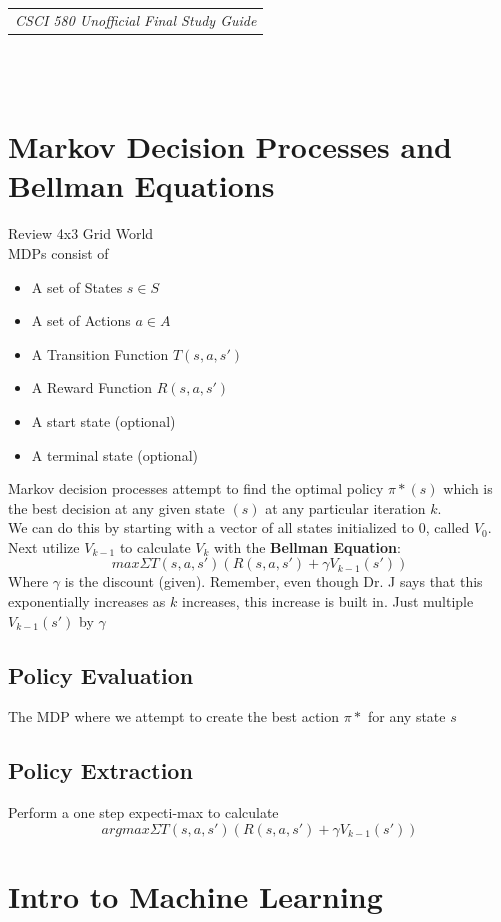 \documentclass{article}
\begin{document}
	\null\hfill\begin{tabular}[t]{l@{}}
	\textit{CSCI 580 Unofficial Final Study Guide}\\
	\end{tabular} \\ \\
\section{Markov Decision Processes and Bellman Equations}
Review 4x3 Grid World\\
MDPs consist of 
\begin{itemize}
	\item A set of States $s\in S$
	\item A set of Actions $a\in A$
	\item A Transition Function $T(s,a,s')$
	\item A Reward Function $R(s,a,s')$
	\item A start state (optional)
	\item A terminal state (optional)
\end{itemize}
Markov decision processes attempt to find the optimal policy $\pi*(s)$ which is the best decision at any given state $(s)$ at any particular iteration $k$.\\
We can do this by starting with a vector of all states initialized to 0, called $V_0$. Next utilize $V_{k-1}$ to calculate $V_k$ with the \textbf{Bellman Equation}:
$$max\Sigma T(s,a,s')(R(s,a,s')+\gamma V_{k-1}(s'))$$
Where $\gamma$ is the discount (given). Remember, even though Dr. J says that this exponentially increases as $k$ increases, this increase is built in. Just multiple $V_{k-1}(s')$ by $\gamma$
\subsection{Policy Evaluation}
The MDP where we attempt to create the best action $\pi*$ for any state $s$
\subsection{Policy Extraction}
Perform a one step expecti-max to calculate
$$argmax\Sigma T(s,a,s')(R(s,a,s')+\gamma V_{k-1}(s'))$$
\section{Intro to Machine Learning}
\end{document}

